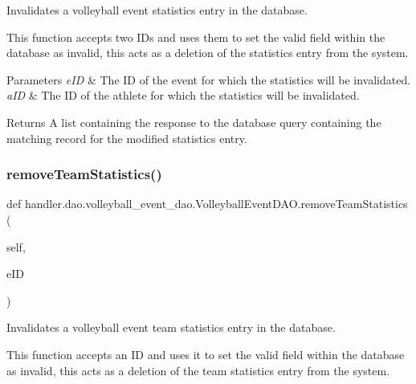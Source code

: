 Invalidates a volleyball event statistics entry in the database. 

This function accepts two I\+Ds and uses them to set the valid field within the database as invalid, this acts as a deletion of the statistics entry from the system.


\begin{DoxyParams}{Parameters}
{\em e\+ID} & The ID of the event for which the statistics will be invalidated. \\
\hline
{\em a\+ID} & The ID of the athlete for which the statistics will be invalidated.\\
\hline
\end{DoxyParams}
\begin{DoxyReturn}{Returns}
A list containing the response to the database query containing the matching record for the modified statistics entry. 
\end{DoxyReturn}
\mbox{\label{classhandler_1_1dao_1_1volleyball__event__dao_1_1_volleyball_event_d_a_o_a6a4b8d0782afa791f574c068bdbe1177}} 
\subsubsection{\texorpdfstring{remove\+Team\+Statistics()}{removeTeamStatistics()}}
{\footnotesize\ttfamily def handler.\+dao.\+volleyball\+\_\+event\+\_\+dao.\+Volleyball\+Event\+D\+A\+O.\+remove\+Team\+Statistics (\begin{DoxyParamCaption}\item[{}]{self,  }\item[{}]{e\+ID }\end{DoxyParamCaption})}



Invalidates a volleyball event team statistics entry in the database. 

This function accepts an ID and uses it to set the valid field within the database as invalid, this acts as a deletion of the team statistics entry from the system.


